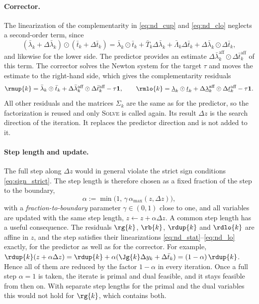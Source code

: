 \paragraph{Corrector.}
The linearization of the complementarity in \eqref{eq:nd_cup} and \eqref{eq:nd_clo} neglects a second-order term, since
\[
    (\bar{\lambda}_k + \Delta\bar{\lambda}_k) \odot (\bar{t}_k + \Delta\bar{t}_k)
    = \bar{\lambda}_k \odot \bar{t}_k + \bar{T}_k \Delta\bar{\lambda}_k + \bar{\Lambda}_k \Delta\bar{t}_k + \Delta\bar{\lambda}_k \odot \Delta\bar{t}_k ,
\]
and likewise for the lower side.
The predictor provides an estimate $\Delta\bar{\lambda}_k^{\text{aff}} \odot \Delta\bar{t}_k^{\text{aff}}$ of this term.
The corrector solves the Newton system for the target $\tau$ and moves the estimate to the right-hand side, which gives the complementarity residuals
\begin{equation} \label{eq:rm_corrector}
    \rmup{k} = \bar{\lambda}_k \odot \bar{t}_k + \Delta\bar{\lambda}_k^{\text{aff}} \odot \Delta\bar{t}_k^{\text{aff}} - \tau \mathbf{1} ,
    \qquad
    \rmlo{k} = \underline{\lambda}_k \odot \underline{t}_k + \Delta\underline{\lambda}_k^{\text{aff}} \odot \Delta\underline{t}_k^{\text{aff}} - \tau \mathbf{1} .
\end{equation}
All other residuals and the matrices $\Sigma_k$ are the same as for the predictor, so the factorization is reused and only \textsc{Solve} is called again.
Its result $\Delta z$ is the search direction of the iteration.
It replaces the predictor direction and is not added to it.

\paragraph{Step length and update.}
The full step along $\Delta z$ would in general violate the strict sign conditions \eqref{eq:sign_strict}.
The step length is therefore chosen as a fixed fraction of the step to the boundary,
\[
    \alpha := \min\big(1,\, \gamma\, \alpha_{\max}(z, \Delta z)\big) ,
\]
with a \textit{fraction-to-boundary} parameter $\gamma \in (0, 1)$ close to one, and all variables are updated with the same step length, $z \gets z + \alpha\Delta z$.
A common step length has a useful consequence.
The residuals $\rg{k}$, $\rb{k}$, $\rdup{k}$ and $\rdlo{k}$ are affine in $z$, and the step satisfies their linearizations \eqref{eq:nd_stat}--\eqref{eq:nd_lo} exactly, for the predictor as well as for the corrector.
For example, $\rdup{k}(z + \alpha\Delta z) = \rdup{k} + \alpha(\Jg{k}\Delta y_k + \Delta\bar{t}_k) = (1 - \alpha)\, \rdup{k}$.
Hence all of them are reduced by the factor $1 - \alpha$ in every iteration.
Once a full step $\alpha = 1$ is taken, the iterate is primal and dual feasible, and it stays feasible from then on.
With separate step lengths for the primal and the dual variables this would not hold for $\rg{k}$, which contains both.

